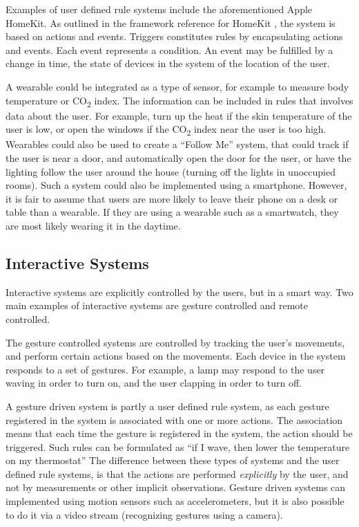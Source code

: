 Examples of user defined rule systems include the aforementioned Apple HomeKit. 
As outlined in the framework reference for HomeKit \cite{applehomekitref}, 
the system is based on actions and events. 
Triggers constitutes rules by encapsulating actions and events. 
Each event represents a condition. 
An event may be fulfilled by a change in time, 
the state of devices in the system of the location of the user.

A wearable could be integrated as a type of sensor, 
for example to measure body temperature or CO\textsubscript{2} index.
The information can be included in rules that involves data about the user. 
For example, turn up the heat if the skin temperature of the user is low, 
or open the windows if the CO\textsubscript{2} index near the user is too high.
Wearables could also be used to create a ``Follow Me'' system, 
that could track if the user is near \eg a door, 
and automatically open the door for the user, 
or have the lighting follow the user around the house (turning off the lights in unoccupied rooms). 
Such a system could also be implemented using a smartphone. 
However, it is fair to assume that users are more likely to leave their phone on a desk or table than a wearable. 
If they are using a wearable such as a smartwatch, 
they are most likely wearing it in the daytime.

\subsection{Interactive Systems}

Interactive systems are explicitly controlled by the users, but in a smart way. 
Two main examples of interactive systems are gesture controlled and remote controlled. 

The gesture controlled systems are controlled by tracking the user's movements, 
and perform certain actions based on the movements.
Each device in the system responds to a set of gestures. 
For example, a lamp may respond to the user waving in order to turn on, 
and the user clapping in order to turn off.

A gesture driven system is partly a user defined rule system, 
as each gesture registered in the system is associated with one or more actions.
The association means that each time the gesture is registered in the system, the action should be triggered. 
Such rules can be formulated as ``if I wave, then lower the temperature on my thermostat''
The difference between these types of systems and the user defined rule systems, 
is that the actions are performed \emph{explicitly} by the user, 
and not by measurements or other implicit observations.
Gesture driven systems can implemented using motion sensors such as accelerometers, 
but it is also possible to do it via a video stream (recognizing gestures using a camera). 

